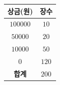 {\setlength{\tabcolsep}{6pt}\renewcommand{\arraystretch}{1.3}%
\begin{tabular}{|c|c|}
\hline
\textbf{상금(원)} & \textbf{장수} \\
\hline
$100000$ & $10$ \\
\hline
$50000$ & $20$ \\
\hline
$10000$ & $50$ \\
\hline
$0$ & $120$ \\
\hline
\textbf{합계} & $200$ \\
\hline
\end{tabular}}

